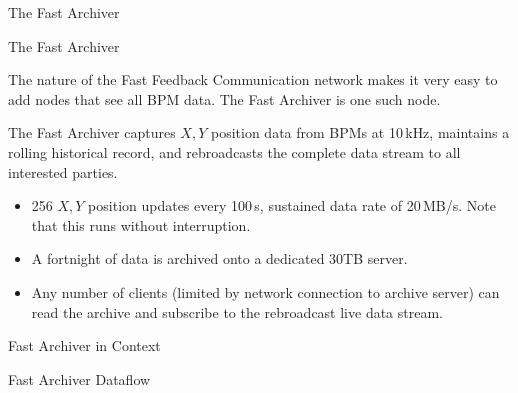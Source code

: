 \documentclass{beamer}
\begin{document}
%
\begin{frame}{The Fast Archiver}

\end{frame}


%
\begin{frame}{The Fast Archiver}

The nature of the Fast Feedback Communication network makes it very easy to add
nodes that see all BPM data.  The Fast Archiver is one such node.

\medskip

The Fast Archiver captures $X,Y$ position data from BPMs at 10\,kHz, maintains a
rolling historical record, and rebroadcasts the complete data stream to all
interested parties.

\begin{itemize}

\item 256 $X,Y$ position updates every 100\,\textmu s, sustained data
rate of 20\,MB/s.  Note that this runs without interruption.

\item A fortnight of data is archived onto a dedicated 30TB server.

\item Any number of clients (limited by network connection to archive server)
can read the archive and subscribe to the rebroadcast live data stream.

\end{itemize}
\end{frame}


%
\begin{frame}{Fast Archiver in Context}
\begin{center}

\end{center}
\end{frame}


%
\begin{frame}{Fast Archiver Dataflow}
\begin{center}

\end{center}
\end{frame}
\end{document}
